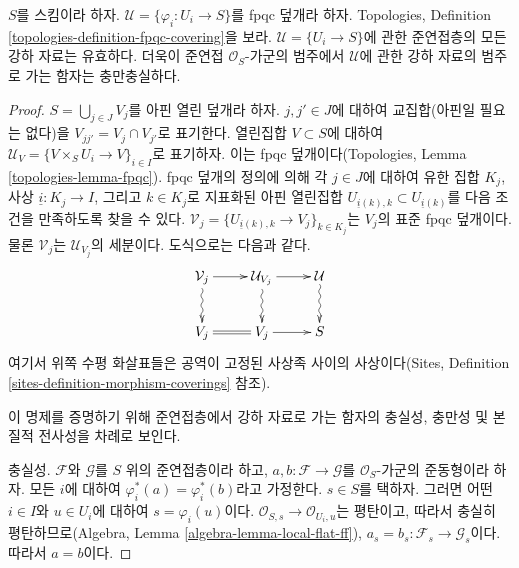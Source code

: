 \begin{proposition}
\label{proposition-fpqc-descent-quasi-coherent}
$S$를 스킴이라 하자.
$\mathcal{U} = \{\varphi_i : U_i \to S\}$를 fpqc 덮개라 하자. Topologies,
Definition \ref{topologies-definition-fpqc-covering}을 보라.
$\mathcal{U} = \{U_i \to S\}$에 관한 준연접층의 모든 강하 자료는
유효하다. 더욱이 준연접 $\mathcal{O}_S$-가군의 범주에서
$\mathcal{U}$에 관한 강하 자료의 범주로 가는 함자는 충만충실하다.
\end{proposition}

\begin{proof}
$S = \bigcup_{j \in J} V_j$를 아핀 열린 덮개라 하자. $j, j' \in J$에
대하여 교집합(아핀일 필요는 없다)을
$V_{jj'} = V_j \cap V_{j'}$로 표기한다. 열린집합 $V \subset S$에 대하여
$\mathcal{U}_V = \{V \times_S U_i \to V\}_{i \in I}$로 표기하자. 이는
fpqc 덮개이다(Topologies, Lemma \ref{topologies-lemma-fpqc}). fpqc 덮개의
정의에 의해 각 $j \in J$에 대하여 유한 집합 $K_j$, 사상
$\underline{i} : K_j \to I$, 그리고 $k \in K_j$로 지표화된 아핀 열린집합
$U_{\underline{i}(k), k} \subset U_{\underline{i}(k)}$를 다음 조건을
만족하도록 찾을 수 있다.
$\mathcal{V}_j = \{U_{\underline{i}(k), k} \to V_j\}_{k \in K_j}$는
$V_j$의 표준 fpqc 덮개이다. 물론 $\mathcal{V}_j$는
$\mathcal{U}_{V_j}$의 세분이다. 도식으로는 다음과 같다.
$$
\xymatrix{
\mathcal{V}_j \ar[r] \ar@{~>}[d] &
\mathcal{U}_{V_j} \ar[r] \ar@{~>}[d] &
\mathcal{U} \ar@{~>}[d] \\
V_j \ar@{=}[r] & V_j \ar[r] & S
}
$$
여기서 위쪽 수평 화살표들은 공역이 고정된 사상족 사이의 사상이다(Sites,
Definition \ref{sites-definition-morphism-coverings} 참조).

\medskip\noindent
이 명제를 증명하기 위해 준연접층에서 강하 자료로 가는 함자의 충실성,
충만성 및 본질적 전사성을 차례로 보인다.

\medskip\noindent
충실성. $\mathcal{F}$와 $\mathcal{G}$를 $S$ 위의 준연접층이라 하고,
$a, b : \mathcal{F} \to \mathcal{G}$를 $\mathcal{O}_S$-가군의 준동형이라
하자. 모든 $i$에 대하여 $\varphi_i^*(a) = \varphi_i^*(b)$라고 가정한다.
$s \in S$를 택하자. 그러면 어떤 $i \in I$와 $u \in U_i$에 대하여
$s = \varphi_i(u)$이다. $\mathcal{O}_{S, s} \to \mathcal{O}_{U_i, u}$는
평탄이고, 따라서 충실히 평탄하므로(Algebra, Lemma
\ref{algebra-lemma-local-flat-ff}),
$a_s = b_s : \mathcal{F}_s \to \mathcal{G}_s$이다. 따라서 $a = b$이다.


\end{proof}
